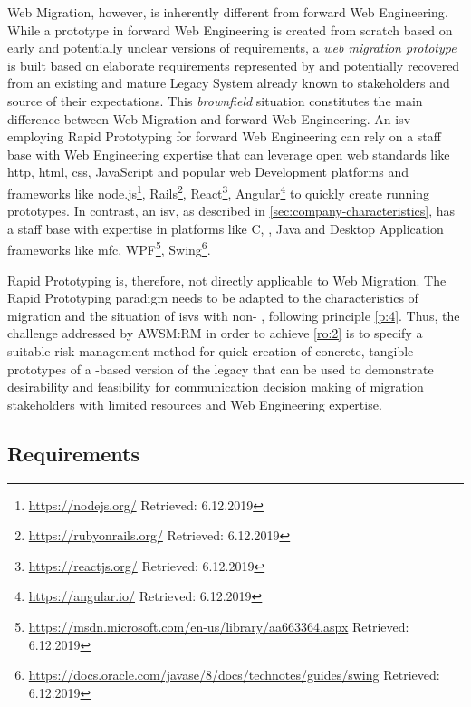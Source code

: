 \gls{Web Migration}, however, is inherently different from forward \gls{Web Engineering}.
While a prototype in forward \gls{Web Engineering} is created from scratch based on early and potentially unclear versions of requirements, a \emph{\gls{web migration prototype}} is built based on elaborate requirements represented by and potentially recovered from an existing and mature \gls{Legacy System} already known to stakeholders and source of their expectations.
This \emph{brownfield} \autocite{Hopkins2008Brownfield} situation constitutes the main difference between \gls{Web Migration} and forward \gls{Web Engineering}.
An \gls{isv} employing \gls{Rapid Prototyping} for forward \gls{Web Engineering} can rely on a staff base with \gls{Web Engineering} expertise that can leverage open \gls{web} standards like \gls{http}, \gls{html}, \gls{css}, JavaScript and popular \gls{web} Development platforms and frameworks like node.js\footnote{\url{https://nodejs.org/} Retrieved: 6.12.2019}, Rails\footnote{\url{https://rubyonrails.org/} Retrieved: 6.12.2019}, React\footnote{\url{https://reactjs.org/} Retrieved: 6.12.2019}, Angular\footnote{\url{https://angular.io/} Retrieved: 6.12.2019} to quickly create running prototypes.
In contrast, an \gls{isv}, as described in \cref{sec:company-characteristics}, has a staff base with expertise in  platforms like C, \cpp, Java and \gls{Desktop Application} frameworks like \gls{mfc}, WPF\footnote{\url{https://msdn.microsoft.com/en-us/library/aa663364.aspx} Retrieved: 6.12.2019}, Swing\footnote{\url{https://docs.oracle.com/javase/8/docs/technotes/guides/swing} Retrieved: 6.12.2019}.

\gls{Rapid Prototyping} is, therefore, not directly applicable to \gls{Web Migration}.
The \gls{Rapid Prototyping} paradigm needs to be adapted to the characteristics of migration and the situation of \glspl{isv} with non-  , following principle \cref{p:4}.
Thus, the challenge addressed by AWSM:RM in order to achieve \cref{ro:2} is to specify a suitable \gls{risk management} method for quick creation of concrete, tangible prototypes of a -based version of the legacy  that can be used to demonstrate desirability and feasibility for communication decision making of migration stakeholders with limited resources and \gls{Web Engineering} expertise.

\vspace{-15pt}
\hypertarget{sec:rm.requirements}{%
\subsection{Requirements}\label{sec:rm.requirements}}
\vspace{5pt}


